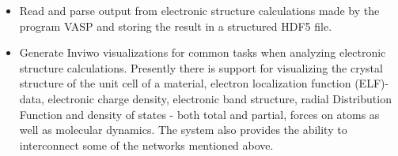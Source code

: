 \begin{itemize}
    \item Read and parse output from electronic structure calculations made by the program VASP and storing the result in a structured HDF5 file.
    
    \item Generate Inviwo visualizations for common tasks when analyzing electronic structure calculations. Presently there is support for visualizing the crystal structure of the unit cell of a material, electron localization function (ELF)-data, electronic charge density, electronic band structure, radial Distribution Function and density of states - both total and partial, forces on atoms as well as molecular dynamics. The system also provides the ability to interconnect some of the networks mentioned above.
\end{itemize}